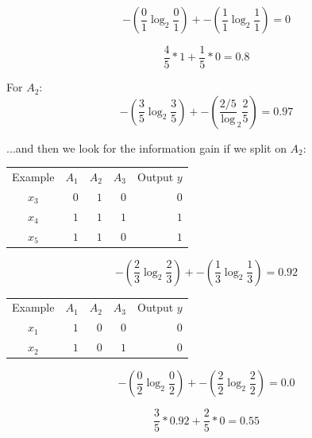 \documentclass{article}
\begin{document}
\begin{equation}
    -(\frac{0}{1}\log_2{\frac{0}{1}}) + -(\frac{1}{1}\log_2{\frac{1}{1}}) = 0
\end{equation}

\begin{equation}
    \frac{4}{5}*1 + \frac{1}{5}*0 = 0.8
\end{equation}

\noindent For $A_2$:
\begin{equation}
    -(\frac{3}{5}\log_2{\frac{3}{5}}) + -(\frac{2/5}\log_2{\frac{2}{5}}) = 0.97
\end{equation}

\noindent ...and then we look for the information gain if we split on $A_2$:

\begin{center}
    \begin{tabular}{ c r r r r }
        Example & $A_1$ & $A_2$ & $A_3$ & Output $y$\\ 
        $x_3$ & $0$ & $1$ & $0$ & $0$\\
        $x_4$ & $1$ & $1$ & $1$ & $1$\\
        $x_5$ & $1$ & $1$ & $0$ & $1$\\
    \end{tabular}
\end{center}

\begin{equation}
    -(\frac{2}{3}\log_2{\frac{2}{3}}) + -(\frac{1}{3}\log_2{\frac{1}{3}}) = 0.92
\end{equation}

\begin{center}
    \begin{tabular}{ c r r r r }
        Example & $A_1$ & $A_2$ & $A_3$ & Output $y$\\ 
        $x_1$ & $1$ & $0$ & $0$ & $0$\\
        $x_2$ & $1$ & $0$ & $1$ & $0$\\
    \end{tabular}
\end{center}

\begin{equation}
    -(\frac{0}{2}\log_2{\frac{0}{2}}) + -(\frac{2}{2}\log_2{\frac{2}{2}}) = 0.0
\end{equation}

\begin{equation}
    \frac{3}{5}*0.92 + \frac{2}{5}*0 = 0.55
\end{equation}
\end{document}
